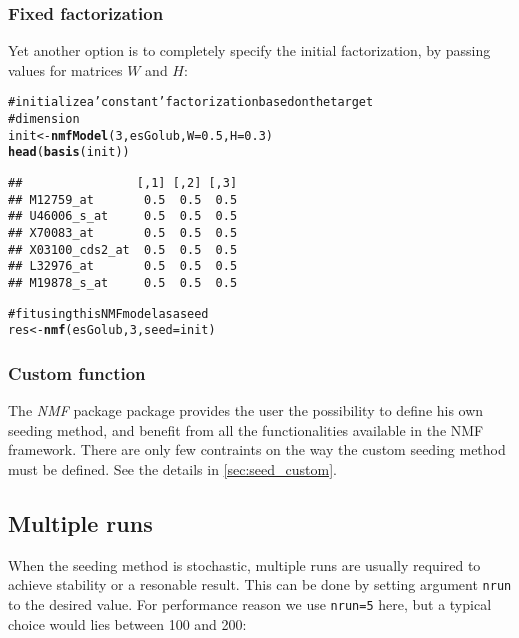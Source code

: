 \documentclass[a4paper]{article}\usepackage{graphicx, color}
\makeatletter
\newcommand{\hlfunctioncall}[1]{\textcolor[rgb]{0.501960784313725,0,0.329411764705882}{\textbf{#1}}}%
\newcommand{\hlcomment}[1]{\textcolor[rgb]{0.180392156862745,0.6,0.341176470588235}{#1}}%
\newenvironment{kframe}{%
 \def\at@end@of@kframe{}%
 \ifinner\ifhmode%
  \def\at@end@of@kframe{\end{minipage}}%
  \begin{minipage}{\columnwidth}%
 \fi\fi%
 \def\FrameCommand##1{\hskip\@totalleftmargin \hskip-\fboxsep
 \colorbox{shadecolor}{##1}\hskip-\fboxsep
     \hskip-\linewidth \hskip-\@totalleftmargin \hskip\columnwidth}%
 \MakeFramed {\advance\hsize-\width
   \@totalleftmargin\z@ \linewidth\hsize
   \@setminipage}}%
 {\par\unskip\endMakeFramed%
 \at@end@of@kframe}
\newenvironment{knitrout}{}{} %
\let\code=\texttt
\newcommand{\pkgname}[1]{\textit{#1}\xspace}
\newcommand{\Rpkg}[1]{\pkgname{#1} package\xspace}
\newcommand{\nmfpack}{\Rpkg{NMF}}
\makeatother
\begin{document}
\subsubsection{Fixed factorization}
Yet another option is to completely specify the initial factorization, by passing values for matrices $W$ and $H$:
\begin{knitrout}
\color{fgcolor}\begin{kframe}
\begin{alltt}
\hlcomment{# initialize a 'constant' factorization based on the target}
\hlcomment{# dimension}
init <- \hlfunctioncall{nmfModel}(3, esGolub, W = 0.5, H = 0.3)
\hlfunctioncall{head}(\hlfunctioncall{basis}(init))
\end{alltt}
\begin{verbatim}
##                [,1] [,2] [,3]
## M12759_at       0.5  0.5  0.5
## U46006_s_at     0.5  0.5  0.5
## X70083_at       0.5  0.5  0.5
## X03100_cds2_at  0.5  0.5  0.5
## L32976_at       0.5  0.5  0.5
## M19878_s_at     0.5  0.5  0.5
\end{verbatim}
\begin{alltt}

\hlcomment{# fit using this NMF model as a seed}
res <- \hlfunctioncall{nmf}(esGolub, 3, seed = init)
\end{alltt}
\end{kframe}
\end{knitrout}



\subsubsection{Custom function}
The \nmfpack package provides the user the possibility to define his own seeding method, and benefit from all the functionalities available in the NMF framework.
There are only few contraints on the way the custom seeding method must be defined.
See the details in \cref{sec:seed_custom}.

\subsection{Multiple runs}

When the seeding method is stochastic, multiple runs are usually required to achieve stability or a resonable result.
This can be done by setting argument \code{nrun} to the desired value. 
For performance reason we use \code{nrun=5} here, but a typical choice would lies between 100 and 200:  
\end{document}

